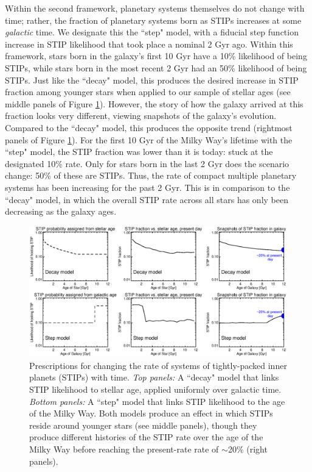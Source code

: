 \documentclass[twocolumn]{aastex631}
\begin{document}
Within the second framework, planetary systems themselves do not change with time; rather, the fraction of planetary systems born as STIPs increases at some \textit{galactic} time. We designate this the ``step" model, with a fiducial step function increase in STIP likelihood that took place a nominal 2 Gyr ago. Within this framework, stars born in the galaxy's first 10 Gyr have a 10\% likelihood of being STIPs, while stars born in the most recent 2 Gyr had an 50\% likelihood of being STIPs. Just like the ``decay" model, this produces the desired increase in STIP fraction among younger stars when applied to our sample of stellar ages (see middle panels of Figure \ref{fig:stip_models}). However, the story of how the galaxy arrived at this fraction looks very different, viewing snapshots of the galaxy's evolution. Compared to the ``decay" model, this produces the opposite trend (rightmost panels of Figure \ref{fig:stip_models}). For the first 10 Gyr of the Milky Way's lifetime with the ``step" model, the STIP fraction was lower than it is today: stuck at the designated 10\% rate. Only for stars born in the last 2 Gyr does the scenario change: 50\% of these are STIPs. Thus, the rate of compact multiple planetary systems has been increasing for the past 2 Gyr. This is in comparison to the ``decay" model, in which the overall STIP rate across all stars has only been decreasing as the galaxy ages. 

\begin{figure}%
    \centering
    \includegraphics[trim={0.5cm 0 0.5cm 0}, width=6.0in]{figures/stip_models.eps}
    \caption{Prescriptions for changing the rate of systems of tightly-packed inner planets (STIPs) with time.  \textit{Top panels:} A ``decay" model that links STIP likelihood to stellar age, applied uniformly over galactic time. \textit{Bottom panels:} A ``step" model that links STIP likelihood to the age of the Milky Way. Both models produce an effect in which STIPs reside around younger stars (see middle panels), though they produce different histories of the STIP rate over the age of the Milky Way before reaching the present-rate rate of $\sim$20\% (right panels).}
    \label{fig:stip_models}
\end{figure}
\end{document}
